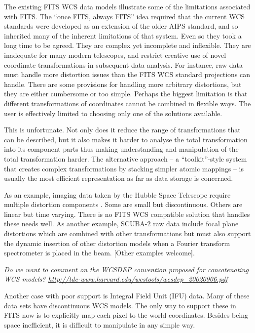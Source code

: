 \documentclass[final,authoryear,5p,times,twocolumn]{elsarticle}
\begin{document}
The existing FITS WCS data models illustrate some of the limitations
associated with FITS. The ``once FITS, always FITS'' idea required that
the current WCS standards were developed as an extension of the older
AIPS standard, and so inherited many of the inherent limitations of
that system. Even so they took a long time to be agreed. They are
complex yet incomplete and inflexible. They are inadequate for many
modern telescopes, and restrict creative use of novel coordinate
transformations in subsequent data analysis. For instance, raw data
must handle more distortion issues than the FITS WCS standard
projections can handle. There are some provisions for handling more
arbitrary distortions, but they are either cumbersome or too
simple. Perhaps the biggest limitation is that different
transformations of coordinates cannot be combined in flexible
ways. The user is effectively limited to choosing only one of the solutions
available.


This is unfortunate. Not only does it reduce the range of
transformations that can be described, but it also makes it harder to
analyse the total transformation into its component parts thus making
understanding and manipulation of the total transformation harder. The
alternative approach -- a ``toolkit''-style system that creates complex
transformations by stacking simpler atomic mappings -- is usually the
most efficient representation as far as data storage is concerned.


As an example, imaging data taken by the Hubble Space Telescope require
multiple distortion components \citep[see e.g.][]{2013ASPC..475...49H}.
Some are small but discontinuous. Others are linear but time varying.
There is no FITS WCS compatible solution that handles these needs well.
As another example, SCUBA-2 raw data \citep[see
e.g.][]{2013MNRAS.430.2513H} include focal plane distortions which are
combined with other transformations but must also support the dynamic
insertion of other distortion models when a Fourier transform
spectrometer \citep{2010SPIE.7741E..67G} is placed in the beam.
{\color{red} [Other examples welcome]}.


\textit{\color{red} Do we want to comment on the WCSDEP convention proposed for
  concatenating WCS models? \url{http://tdc-www.harvard.edu/wcstools/wcsdep_20020906.pdf}}

Another case with poor support is Integral Field Unit (IFU) data.
Many of these data sets
have discontinuous WCS models. The only way to support these in FITS
now is to explicitly map each pixel to the world coordinates. Besides
being space inefficient, it is difficult to manipulate in any simple
way.
\end{document}
